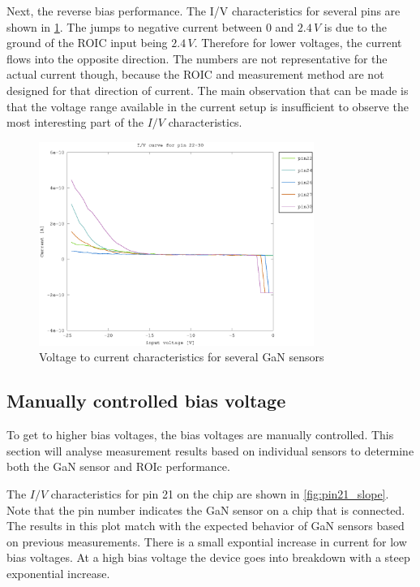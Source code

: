Next, the reverse bias performance. The I/V characteristics for several pins are shown in \cref{fig:pin22_30_slope}. The jumps to negative current between 0 and $2.4\,V$ is due to the ground of the ROIC input being $2.4\,V$. Therefore for lower voltages, the current flows into the opposite direction. The numbers are not representative for the actual current though, because the ROIC and measurement method are not designed for that direction of current. The main observation that can be made is that the voltage range available in the current setup is insufficient to observe the most interesting part of the $I/V$ characteristics.  

\begin{figure}[h]
	    \centering
	    \includegraphics[width=0.8\textwidth]{fig/pin22-30_slope_-25-0V.eps}
	    \caption[]%
	    {Voltage to current characteristics for several GaN sensors}    
	    \label{fig:pin22_30_slope}	
\end{figure}  



\clearpage
\subsection{Manually controlled bias voltage}
To get to higher bias voltages, the bias voltages are manually controlled. This section will analyse measurement results based on individual sensors to determine both the GaN sensor and ROIc performance. 

The $I/V$ characteristics for pin 21 on the chip are shown in \cref{fig:pin21_slope}. Note that the pin number indicates the GaN sensor on a chip that is connected. The results in this plot match with the expected behavior of GaN sensors based on previous measurements. There is a small expontial increase in current for low bias voltages. At a high bias voltage the device goes into breakdown with a steep exponential increase.

